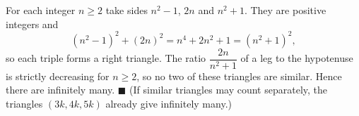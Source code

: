 For each integer $n\ge2$ take sides $n^2-1$, $2n$ and $n^2+1$. They are positive integers and
\[
(n^2-1)^2+(2n)^2=n^4+2n^2+1=(n^2+1)^2,
\]
so each triple forms a right triangle. The ratio $\dfrac{2n}{n^2+1}$ of a leg to the hypotenuse is strictly decreasing for $n\ge2$, so no two of these triangles are similar. Hence there are infinitely many. $\blacksquare$ (If similar triangles may count separately, the triangles $(3k,4k,5k)$ already give infinitely many.)
